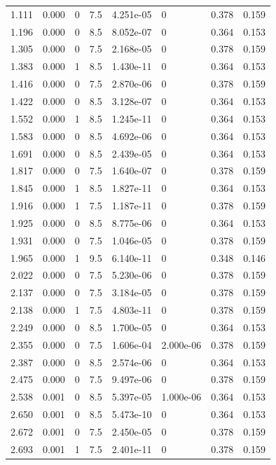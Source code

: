 \documentclass[preview]{standalone}
\begin{document}
{{\begin{tabular}{L{1.2cm}C{1.2cm} C{0.3cm}C{0.5cm} C{1.4cm}C{1.4cm} C{1.4cm}C{1.4cm}}
  1.111  &  0.000  & 0     & 7.5 &  4.251e-05  & 0  & 0.378 &  0.159   \\ 
  1.196  &  0.000  & 0     & 8.5 &  8.052e-07  & 0  & 0.364 &  0.153   \\ 
  1.305  &  0.000  & 0     & 7.5 &  2.168e-05  & 0  & 0.378 &  0.159   \\ 
  1.383  &  0.000  & 1     & 8.5 &  1.430e-11  & 0  & 0.364 &  0.153   \\ 
  1.416  &  0.000  & 0     & 7.5 &  2.870e-06  & 0  & 0.378 &  0.159   \\ 
  1.422  &  0.000  & 0     & 8.5 &  3.128e-07  & 0  & 0.364 &  0.153   \\ 
  1.552  &  0.000  & 1     & 8.5 &  1.245e-11  & 0  & 0.364 &  0.153   \\ 
  1.583  &  0.000  & 0     & 8.5 &  4.692e-06  & 0  & 0.364 &  0.153   \\ 
  1.691  &  0.000  & 0     & 8.5 &  2.439e-05  & 0  & 0.364 &  0.153   \\ 
  1.817  &  0.000  & 0     & 7.5 &  1.640e-07  & 0  & 0.378 &  0.159   \\ 
  1.845  &  0.000  & 1     & 8.5 &  1.827e-11  & 0  & 0.364 &  0.153   \\ 
  1.916  &  0.000  & 1     & 7.5 &  1.187e-11  & 0  & 0.378 &  0.159   \\ 
  1.925  &  0.000  & 0     & 8.5 &  8.775e-06  & 0  & 0.364 &  0.153   \\ 
  1.931  &  0.000  & 0     & 7.5 &  1.046e-05  & 0  & 0.378 &  0.159   \\ 
  1.965  &  0.000  & 1     & 9.5 &  6.140e-11  & 0  & 0.348 &  0.146   \\ 
  2.022  &  0.000  & 0     & 7.5 &  5.230e-06  & 0  & 0.378 &  0.159   \\ 
  2.137  &  0.000  & 0     & 7.5 &  3.184e-05  & 0  & 0.378 &  0.159   \\ 
  2.138  &  0.000  & 1     & 7.5 &  4.803e-11  & 0  & 0.378 &  0.159   \\ 
  2.249  &  0.000  & 0     & 8.5 &  1.700e-05  & 0  & 0.364 &  0.153   \\ 
  2.355  &  0.000  & 0     & 7.5 &  1.606e-04  & 2.000e-06  & 0.378 &  0.159   \\ 
  2.387  &  0.000  & 0     & 8.5 &  2.574e-06  & 0  & 0.364 &  0.153   \\ 
  2.475  &  0.000  & 0     & 7.5 &  9.497e-06  & 0  & 0.378 &  0.159   \\ 
  2.538  &  0.001  & 0     & 8.5 &  5.397e-05  & 1.000e-06  & 0.364 &  0.153   \\ 
  2.650  &  0.001  & 0     & 8.5 &  5.473e-10  & 0  & 0.364 &  0.153   \\ 
  2.672  &  0.001  & 0     & 7.5 &  2.450e-05  & 0  & 0.378 &  0.159   \\ 
  2.693  &  0.001  & 1     & 7.5 &  2.401e-11  & 0  & 0.378 &  0.159   \\ 
\hline 
\end{tabular} 

}}
\end{document}
